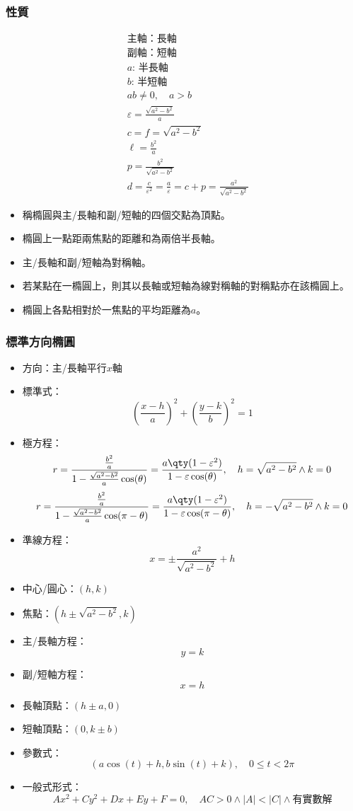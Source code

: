 \documentclass[a4paper,12pt]{report}
\begin{document}
\subsubsection{性質}
\[\begin{aligned}
&\text{主軸：長軸}\\
&\text{副軸：短軸}\\
&a:\,\text{半長軸}\\
&b:\,\text{半短軸}\\
&ab\neq 0,\quad a>b\\
&\varepsilon=\frac{\sqrt{a^2-b^2}}{a}\\
&c=f=\sqrt{a^2-b^2}\\
&\ell=\frac{b^2}{a}\\
&p=\frac{b^2}{\sqrt{a^2-b^2}}\\
&d=\frac{c}{\varepsilon^2}=\frac{a}{\varepsilon}=c+p=\frac{a^2}{\sqrt{a^2-b^2}}
\end{aligned}\]
\begin{itemize}
\item 稱橢圓與主/長軸和副/短軸的四個交點為頂點。
\item 橢圓上一點距兩焦點的距離和為兩倍半長軸。
\item 主/長軸和副/短軸為對稱軸。
\item 若某點在一橢圓上，則其以長軸或短軸為線對稱軸的對稱點亦在該橢圓上。
\item 橢圓上各點相對於一焦點的平均距離為$a$。
\end{itemize}
\subsubsection{標準方向橢圓}
\begin{itemize}
\item 方向：主/長軸平行$x$軸
\item 標準式：
\[\left(\frac{x-h}{a}\right)^2+\left(\frac{y-k}{b}\right)^2=1\]
\item 極方程：
\[r=\frac{\frac{b^2}{a}}{1-\frac{\sqrt{a^2-b^2}}{a}\cos(\theta)}=\frac{a\qty(1-\varepsilon^2)}{1-\varepsilon\cos(\theta)},\quad h=\sqrt{a^2-b^2}\land k=0\]
\[r=\frac{\frac{b^2}{a}}{1-\frac{\sqrt{a^2-b^2}}{a}\cos(\pi-\theta)}=\frac{a\qty(1-\varepsilon^2)}{1-\varepsilon\cos(\pi-\theta)},\quad h=-\sqrt{a^2-b^2}\land k=0\]
\item 準線方程：
\[x=\pm\frac{a^2}{\sqrt{a^2-b^2}}+h\]
\item 中心/圓心：$(h,k)$
\item 焦點：$(h\pm\sqrt{a^2-b^2},k)$
\item 主/長軸方程：
\[y=k\]
\item 副/短軸方程：
\[x=h\]
\item 長軸頂點：$(h\pm a,0)$
\item 短軸頂點：$(0,k\pm b)$
\item 參數式：
\[(a\cos(t)+h,b\sin(t)+k),\quad0\leq t<2\pi\]
\item 一般式形式：
\[Ax^2+Cy^2+Dx+Ey+F=0,\quad AC>0\land |A|<|C|\land\text{有實數解}\]
\end{itemize}
\end{document}
